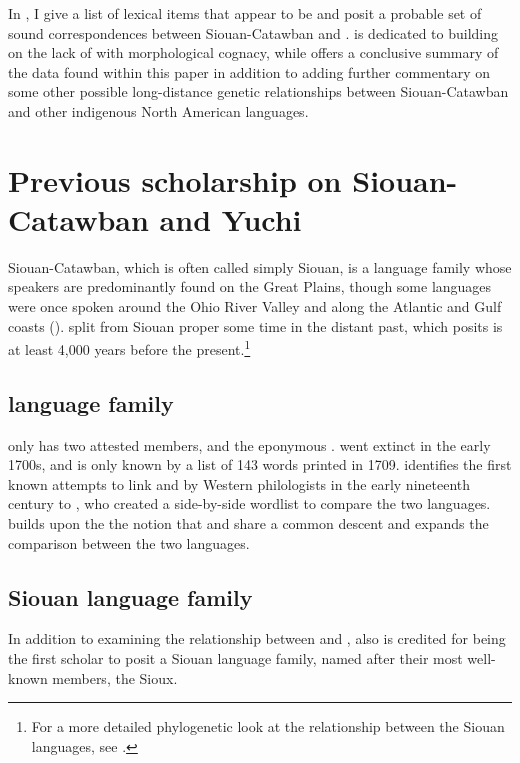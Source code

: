 \documentclass[output=paper]{LSP/langsci}
\begin{document}
In , I give a list of lexical items that appear to be  and posit a probable set of sound correspondences between Siouan-Catawban and .  is dedicated to building on the lack of  with morphological cognacy, while  offers a conclusive summary of the data found within this paper in addition to adding further commentary on some other possible long-distance genetic relationships between Siouan-Catawban and other indigenous North American languages.

\section{Previous scholarship on Siouan-Catawban and Yuchi}\label{sec:kasak:2}

Siouan-Catawban, which is often called simply Siouan, is a language family whose speakers are predominantly found on the Great Plains, though some languages were once spoken around the Ohio River Valley and along the Atlantic and Gulf coasts (\citealt{Mithun1999}).  split from Siouan proper some time in the distant past, which \citet{Rankin1996} posits is at least 4,000 years before the present.\footnote{For a more detailed phylogenetic look at the relationship between the Siouan languages, see \citet{Rankin2010}.}

\subsection{ language family}

 only has two attested members,  and the eponymous .  went extinct in the early 1700s, and is only known by a list of 143 words printed in 1709. \citet{Carter1980} identifies the first known attempts to link  and  by Western philologists in the early nineteenth century to  \citet{AdelungVater1816}, who created a side-by-side wordlist to compare the two languages. \citet{Gallatin1836} builds upon the the notion that  and  share a common descent and expands the comparison between the two languages.

\subsection{Siouan language family}

In addition to examining the relationship between  and , \citet{Gallatin1836} also is credited for being the first scholar to posit a Siouan language family, named after their most well-known members, the Sioux. 
\end{document}
